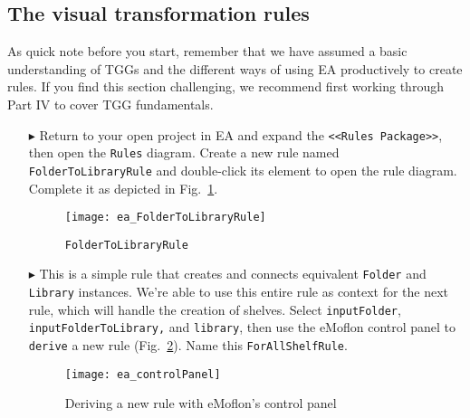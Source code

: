 \newpage
\hypertarget{treeToModel vis}{}
\subsection{The visual transformation rules}
\visHeader

As quick note before you start, remember that we have assumed a basic understanding of TGGs and the different ways of using EA productively to create rules. If
you find this section challenging, we recommend first working through Part IV to cover TGG fundamentals.

\begin{itemize}

\subsubsection{FolderToLibraryRule} %

\item[$\blacktriangleright$] Return to your open project in EA and expand the \texttt{<<Rules Package>>}, then open the \texttt{Rules} diagram.
Create a new rule named \texttt{Fol\-der\-To\-Lib\-rar\-y\-Rule} and double-click its element to open the rule diagram. Complete it as depicted in
Fig.~\ref{ea:FolderIntoLibrary_Complete}.

\vspace{0.5cm}

\begin{figure}[htbp]
\begin{center}
  \texttt{[image: ea\_FolderToLibraryRule]}
  \caption{\texttt{FolderToLibraryRule}}
  \label{ea:FolderIntoLibrary_Complete}
\end{center}
\end{figure}

\item[$\blacktriangleright$] This is a simple rule that creates and connects equivalent \texttt{Folder} and \texttt{Library} instances. We're able to use this
entire rule as context for the next rule, which will handle the creation of shelves. Select \texttt{inputFolder}, \texttt{in\-put\-Fol\-der\-To\-Lib\-rary,} and
\texttt{library}, then use the eMoflon control panel to \texttt{derive} a new rule (Fig.~\ref{ea:controlPanel}).
Name this \texttt{ForAllShelfRule}.

\vspace{0.5cm}

\begin{figure}[htbp]
\begin{center}
  \texttt{[image: ea\_controlPanel]}
  \caption{Deriving a new rule with eMoflon's control panel}
  \label{ea:controlPanel}
\end{center}
\end{figure}


\end{itemize}
